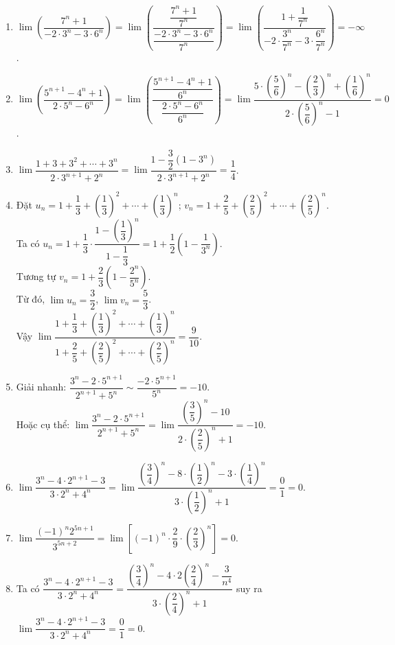 \begin{ex}
{\begin{enumerate}
			\item $\lim \left(\dfrac{7^n+1}{-2\cdot 3^n-3\cdot 6^n}\right)=\lim \left(\dfrac{\dfrac{7^n+1}{7^n}}{\dfrac{-2\cdot 3^n-3\cdot 6^n}{7^n}}\right)=\lim \left(\dfrac{1+\dfrac{1}{7^n}}{-2\cdot \dfrac{3^n}{7^n}-3\cdot \dfrac{6^n}{7^n}}\right)=-\infty$. 
			\item $\lim \left(\dfrac{5^{n+1}-4^n+1}{2\cdot 5^n-6^n}\right)=\lim \left(\dfrac{\dfrac{5^{n+1}-4^n+1}{6^n}}{\dfrac{2\cdot 5^n-6^n}{6^n}}\right)=\lim \dfrac{5\cdot  \left(\dfrac{5}{6}\right)^n-\left(\dfrac{2}{3}\right)^n+\left(\dfrac{1}{6}\right)^n}{2\cdot \left(\dfrac{5}{6}\right)^n-1}=0$.
			\item $\lim \dfrac{1+3+3^2+\cdots+3^n}{2\cdot 3^{n+1}+2^n}=\lim \dfrac{1-\dfrac{3}{2}\left(1-3^n\right)}{2\cdot 3^{n+1}+2^n}=\dfrac{1}{4}$. 
			\item Đặt  $u_n=1+\dfrac{1}{3}+\left(\dfrac{1}{3}\right)^2+\cdots+\left(\dfrac{1}{3}\right)^n$; $v_n=1+\dfrac{2}{5}+\left(\dfrac{2}{5}\right)^2+\cdots+\left(\dfrac{2}{5}\right)^n$.\\
			Ta có $u_n=1+\dfrac{1}{3} \cdot \dfrac{1-\left(\dfrac{1}{3}\right)^n}{1-\dfrac{1}{3}}=1+\dfrac{1}{2}\left(1-\dfrac{1}{3^n}\right)$.\\ 
			Tương tự  $v_n=1+\dfrac{2}{3}\left(1-\dfrac{2^n}{5^n}\right)$.\\
			Từ đó, $\lim u_n=\dfrac{3}{2}$,  $\lim v_n=\dfrac{5}{3}$.\\
			Vậy  $\lim \dfrac{1+\dfrac{1}{3}+\left(\dfrac{1}{3}\right)^2+\cdots+\left(\dfrac{1}{3}\right)^n}{1+\dfrac{2}{5}+\left(\dfrac{2}{5}\right)^2+\cdots+\left(\dfrac{2}{5}\right)^n}=\dfrac{9}{10}$.
			\item Giải nhanh: $\dfrac{3^n-2\cdot 5^{n+1}}{2^{n+1}+5^n} \sim \dfrac{-2\cdot  5^{n+1}}{5^n}=-10$.\\
			Hoặc cụ thể: $\lim \dfrac{3^n-2\cdot 5^{n+1}}{2^{n+1}+5^n}=\lim \dfrac{\left(\dfrac{3}{5}\right)^n-10}{2\cdot \left(\dfrac{2}{5}\right)^n+1}=-10$. 
			\item  $\lim \dfrac{3^n-4\cdot 2^{n+1}-3}{3\cdot 2^n+4^n}=\lim \dfrac{\left(\dfrac{3}{4}\right)^n-8\cdot\left(\dfrac{1}{2}\right)^n-3\cdot\left(\dfrac{1}{4}\right)^n}{3\cdot\left(\dfrac{1}{2}\right)^n+1}=\dfrac0{1}=0$.
			\item $\lim \dfrac{(-1)^n 2^{5n+1}}{3^{5n+2}}=\lim\left[(-1)^n  \cdot \dfrac{2}{9}\cdot \left(\dfrac{2}{3}\right)^n\right]=0$.
			\item Ta có  $\dfrac{3^n-4\cdot 2^{n+1}-3}{3\cdot 2^n+4^n}=\dfrac{\left(\dfrac{3}{4}\right)^n-4\cdot 2\left(\dfrac{2}{4}\right)^n-\dfrac{3}{n^4}}{3\cdot \left(\dfrac{2}{4}\right)^n+1}$ suy ra $\lim \dfrac{3^n-4\cdot 2^{n+1}-3}{3\cdot 2^n+4^n}=\dfrac0{1}=0$.
		\end{enumerate}
	 }
\end{ex}

